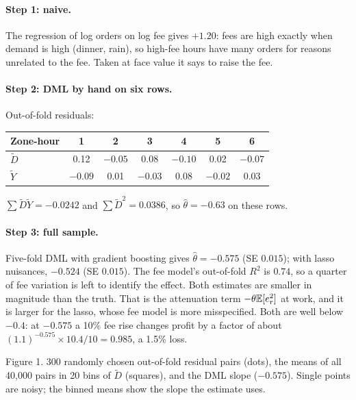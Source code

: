 \documentclass[11pt]{article}
\begin{document}
\paragraph{Step 1: naive.} The regression of log orders on log fee gives $+1.20$: fees are high exactly when demand is high (dinner,
rain), so high-fee hours have many orders for reasons unrelated to the fee. Taken at face value it says to raise the fee.

\paragraph{Step 2: DML by hand on six rows.} Out-of-fold residuals:
\begin{center}
\begin{tabular}{lcccccc}
\toprule
Zone-hour & 1 & 2 & 3 & 4 & 5 & 6 \\
\midrule
$\tilde D$ & 0.12 & $-0.05$ & 0.08 & $-0.10$ & 0.02 & $-0.07$ \\
$\tilde Y$ & $-0.09$ & 0.01 & $-0.03$ & 0.08 & $-0.02$ & 0.03 \\
\bottomrule
\end{tabular}
\end{center}
$\sum\tilde D\tilde Y = -0.0242$ and $\sum\tilde D^2 = 0.0386$, so $\hat\theta = -0.63$ on these rows.

\paragraph{Step 3: full sample.} Five-fold DML with gradient boosting gives $\hat\theta = -0.575$ (SE $0.015$); with lasso nuisances, $-0.524$
(SE $0.015$). The fee model's out-of-fold $R^2$ is $0.74$, so a quarter of fee variation is left to identify the effect. Both estimates are
smaller in magnitude than the truth. That is the attenuation term $-\theta\mathbb{E}[e_r^2]$ at work, and it is larger for the lasso, whose fee
model is more misspecified. Both are
well below $-0.4$: at $-0.575$ a 10\% fee rise changes profit by a factor of about $(1.1)^{-0.575} \times 10.4/10 = 0.985$, a 1.5\% loss.

\begin{center}

\small Figure 1. 300 randomly chosen out-of-fold residual pairs (dots), the means of all 40{,}000 pairs in 20 bins of $\tilde D$ (squares),
and the DML slope ($-0.575$). Single points are noisy; the binned means show the slope the estimate uses.
\end{center}
\end{document}
